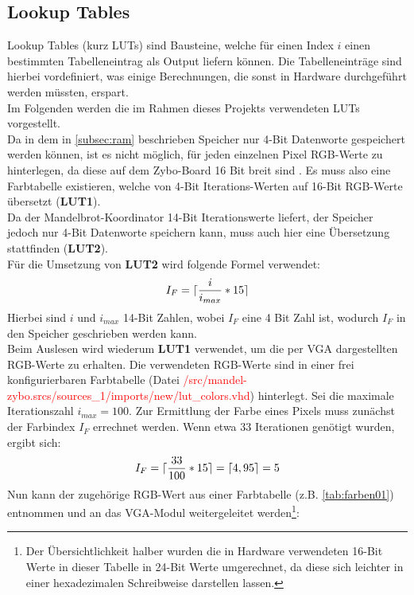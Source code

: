 \documentclass[a4paper,12pt,onesided]{report}
\begin{document}
\subsection{Lookup Tables}
\label{subsec:luts}
Lookup Tables (kurz LUTs) sind Bausteine, welche für einen Index $i$ einen bestimmten Tabelleneintrag als Output liefern können.
Die Tabelleneinträge sind hierbei vordefiniert, was einige Berechnungen, die sonst in Hardware durchgeführt werden müssten, erspart.\\
Im Folgenden werden die im Rahmen dieses Projekts verwendeten LUTs vorgestellt.\\
Da in dem in \autoref{subsec:ram} beschrieben Speicher nur 4-Bit Datenworte gespeichert werden können, ist es nicht möglich, für jeden einzelnen Pixel RGB-Werte zu hinterlegen, da diese auf dem Zybo-Board 16 Bit breit sind \cite{zyboref}. Es muss also eine Farbtabelle existieren, welche von 4-Bit Iterations-Werten auf 16-Bit RGB-Werte übersetzt (\textbf{LUT1}).\\
Da der Mandelbrot-Koordinator 14-Bit Iterationswerte liefert, der Speicher jedoch nur 4-Bit Datenworte speichern kann, muss auch hier eine Übersetzung stattfinden (\textbf{LUT2}).\\
Für die Umsetzung von \textbf{LUT2} wird folgende Formel verwendet:
\[I_F = \lceil\frac{i}{i_{max}}*15\rceil\]
Hierbei sind $i$ und $i_{max}$ 14-Bit Zahlen, wobei $I_F$ eine 4 Bit Zahl ist, wodurch $I_F$ in den Speicher geschrieben werden kann.\\
Beim Auslesen wird wiederum \textbf{LUT1} verwendet, um die per VGA dargestellten RGB-Werte zu erhalten.
Die verwendeten RGB-Werte sind in einer frei konfigurierbaren Farbtabelle (Datei \textcolor{red}{/src/mandel-zybo.srcs/sources\_1/imports/new/lut\_colors.vhd}) hinterlegt.
Sei die maximale Iterationszahl $i_{max} = 100$.
Zur Ermittlung der Farbe eines Pixels muss zunächst der Farbindex $I_F$ errechnet werden. Wenn etwa 33 Iterationen genötigt wurden, ergibt sich:
\[I_F = \lceil\frac{33}{100}*15\rceil = \lceil4,95\rceil = 5\]
Nun kann der zugehörige RGB-Wert aus einer Farbtabelle (z.B. \autoref{tab:farben01}) entnommen und an das VGA-Modul weitergeleitet werden\footnote{Der Übersichtlichkeit halber wurden die in Hardware verwendeten 16-Bit Werte in dieser Tabelle in 24-Bit Werte umgerechnet, da diese sich leichter in einer hexadezimalen Schreibweise darstellen lassen.}:
\end{document}
